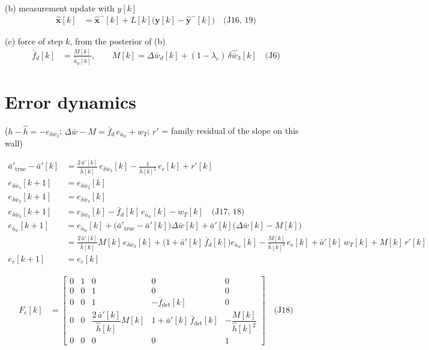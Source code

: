 \documentclass[11pt,a4paper,fontset=none]{ctexart}
\newcommand{\ba}{\bar{a}}
\newcommand{\bw}{\bar{w}}
\newcommand{\dW}{\Delta\bw}
\newcommand{\ap}{\ba'}
\newcommand{\ah}{\hat{\ba}_w}
\newcommand{\hh}{\hat{h}}
\newcommand{\lc}{\lambda_c}
\newcommand{\fd}{\bar{f}_d}
\newcommand{\fdet}{\bar{f}_{\det}}
\newcommand{\J}[1]{\quad\text{(J#1)}}
\begin{document}
(b) measurement update with $y[k]$
\begin{align*}
\hat{\mathbf{x}}[k] &= \hat{\mathbf{x}}^{-}[k] + L[k]\bigl(\mathbf{y}[k] - \hat{\mathbf{y}}^{-}[k]\bigr) \J{16, 19}
\end{align*}

(c) force of step $k$, from the posterior of (b)
\begin{align*}
\fd[k] &= \frac{M[k]}{\ah[k]}, \qquad M[k] = \dW_d[k] + (1-\lc)\,\delta\hat{\bw}_3[k] \J{6}
\end{align*}

\section{Error dynamics}

($h - \hh = -e_{\delta\bw_3}$; $\dW - M = \fd\,e_{\ba_w} + w_T$; $r'$ = family residual of the slope on this wall)

\begin{align*}
\ap_{\mathrm{true}} - \ap[k] &= \frac{2\,\ap[k]}{\hh[k]}\,e_{\delta\bw_3}[k] - \frac{1}{\hh[k]^{2}}\,e_c[k] + r'[k] \\[6pt]
e_{\delta\bw_1}[k+1] &= e_{\delta\bw_2}[k] \\
e_{\delta\bw_2}[k+1] &= e_{\delta\bw_3}[k] \\
e_{\delta\bw_3}[k+1] &= e_{\delta\bw_3}[k] - \fd[k]\,e_{\ba_w}[k] - w_T[k] \J{17, 18} \\
e_{\ba_w}[k+1]       &= e_{\ba_w}[k] + \bigl(\ap_{\mathrm{true}} - \ap[k]\bigr)\dW[k] + \ap[k]\bigl(\dW[k] - M[k]\bigr) \\
                     &= \frac{2\,\ap[k]}{\hh[k]}M[k]\,e_{\delta\bw_3}[k]
                        + \bigl(1 + \ap[k]\,\fd[k]\bigr)e_{\ba_w}[k]
                        - \frac{M[k]}{\hh[k]^{2}}\,e_c[k]
                        + \ap[k]\,w_T[k] + M[k]\,r'[k] \\
e_c[k+1]             &= e_c[k]
\end{align*}

\begin{align*}
F_e[k] &= \begin{bmatrix}
0 & 1 & 0 & 0 & 0 \\
0 & 0 & 1 & 0 & 0 \\
0 & 0 & 1 & -\fdet[k] & 0 \\
0 & 0 & \dfrac{2\,\ap[k]}{\hh[k]}M[k] & 1 + \ap[k]\,\fdet[k] & -\dfrac{M[k]}{\hh[k]^{2}} \\
0 & 0 & 0 & 0 & 1
\end{bmatrix} \J{18}
\end{align*}
\end{document}
